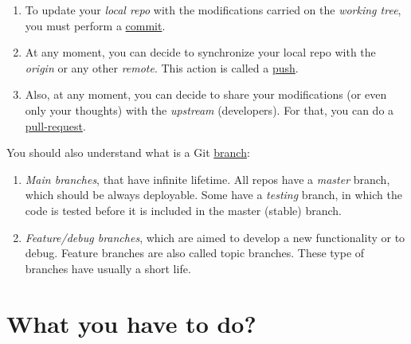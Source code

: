 \begin{enumerate}
\item To update your \emph{local repo} with the modifications carried
  on the \emph{working tree}, you must perform a
  \href{https://docs.github.com/en/github/getting-started-with-github/github-glossary#commit}{commit}.
  
\item At any moment, you can decide to synchronize your local repo
  with the \emph{origin} or any other \emph{remote}. This action is
  called a
  \href{https://docs.github.com/en/github/using-git/pushing-commits-to-a-remote-repository}{push}.
\item Also, at any moment, you can decide to share your modifications
  (or even only your thoughts) with the \emph{upstream}
  (developers). For that, you can do a
  \href{https://docs.github.com/en/github/collaborating-with-issues-and-pull-requests/about-pull-requests}{pull-request}.
\end{enumerate}

You should also understand what is a
Git \href{https://docs.gitlab.com/ee/topics/gitlab_flow.html}{branch}:
\begin{enumerate}
\item \emph{Main branches}, that have infinite lifetime. All repos
  have a \emph{master} branch, which should be always deployable. Some
  have a \emph{testing} branch, in which the code is tested before it
  is included in the master (stable) branch.
\item \emph{Feature/debug branches}, which are aimed to develop a new
  functionality or to debug. Feature branches are also called topic
  branches. These type of branches have usually a short life.
\end{enumerate}

\section{What you have to do?}

